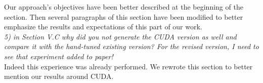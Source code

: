 \documentclass[10pt]{article}
\begin{document}
Our approach's objectives have been better described at the beginning of the section. Then several paragraphs of this section have been modified to
better emphasize the results and expectations of this part of our work.\\

\noindent
{\em 5) in Section V.C why did you not generate the CUDA version as well and compare it with the hand-tuned existing version? For the revised version, I need to see that experiment added to paper!}\\ 

Indeed this experience was already performed. We rewrote this section to better mention our results around CUDA. 
\end{document}
